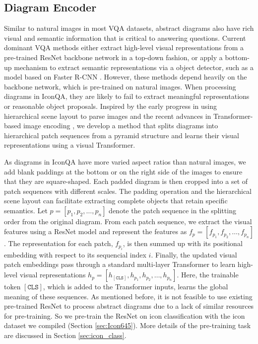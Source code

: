\documentclass{article}
\begin{document}
\subsection{Diagram Encoder}
Similar to natural images in most VQA datasets, abstract diagrams also have rich visual and semantic information that is critical to answering questions. Current dominant VQA methods \cite{antol2015vqa, Anderson2017up,Kim2018,gao2019dynamic,yu2019mcan,jiang2020defense,agarwal2020towards} either extract high-level visual representations from a pre-trained ResNet backbone network \cite{he2016deep} in a top-down fashion, or apply a bottom-up mechanism to extract semantic representations via a object detector, such as a model based on Faster R-CNN \cite{ren2015faster}. However, these methods depend heavily on the backbone network, which is pre-trained on natural images. When processing diagrams in IconQA, they are likely to fail to extract meaningful representations or reasonable object proposals. Inspired by the early progress in using hierarchical scene layout to parse images \cite{li2010object, zhu2015reconfigurable,wang2015learning} and the recent advances in Transformer-based image encoding \cite{lu2019vilbert, li2019visualbert,wonjae2021an}, we develop a method that splits diagrams into hierarchical patch sequences from a pyramid structure and learns their visual representations using a visual Transformer.

As diagrams in IconQA have more varied aspect ratios than natural images, we add blank paddings at the bottom or on the right side of the images to ensure that they are square-shaped. Each padded diagram is then cropped into a set of patch sequences with different scales. The padding operation and the hierarchical scene layout can facilitate extracting complete objects that retain specific semantics. Let $p = [p_1, p_2, \dots , p_n]$ denote the patch sequence in the splitting order from the original diagram. From each patch sequence, we extract the visual features using a ResNet model and represent the features as $f_p = [f_{p_1}, f_{p_2}, \dots , f_{p_n}]$. The representation for each patch, $f_{p_i}$, is then summed up with its positional embedding with respect to its sequencial index $i$. Finally, the updated visual patch embeddings pass through a standard multi-layer Transformer \cite{vaswani2017attention} to learn high-level visual representations $h_p = [h_{\mathtt{[CLS]}}, h_{p_1}, h_{p_2}, \dots , h_{p_n}]$. Here, the trainable token $\mathtt{[CLS]}$, which is added to the Transformer inputs, learns the global meaning of these sequences. As mentioned before, it is not feasible to use existing pre-trained ResNet to process abstract diagrams due to a lack of similar resources for pre-training. So we pre-train the ResNet on icon classification with the icon dataset we compiled (Section \ref{sec:Icon645}). More details of the pre-training task are discussed in Section \ref{sec:icon_class}.
\end{document}
